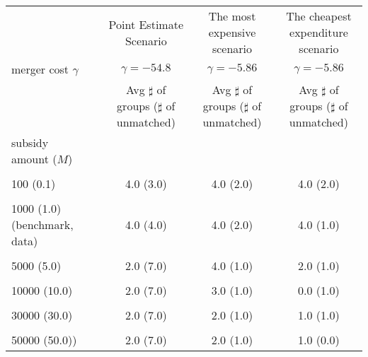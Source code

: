 \begin{tabular}{@{\extracolsep{5pt}}lcccc}
\toprule 
 &  & Point Estimate Scenario & The most expensive scenario & The cheapest expenditure scenario \\
merger cost $\gamma$ &  & $\gamma=-54.8$ & $\gamma=-5.86$ & $\gamma=-5.86$ \\
 &  & Avg $\sharp$ of groups ($\sharp$ of unmatched) & Avg $\sharp$ of groups ($\sharp$ of unmatched) & Avg $\sharp$ of groups ($\sharp$ of unmatched) \\
\midrule 
subsidy amount ($M$) &  &  &  &  \\
 &  &  &  &  \\
100 (0.1) &  & 4.0 (3.0) & 4.0 (2.0) & 4.0 (2.0) \\
 &  &  &  &  \\
1000 (1.0) (benchmark, data) &  & 4.0 (4.0) & 4.0 (2.0) & 4.0 (1.0) \\
 &  &  &  &  \\
5000 (5.0) &  & 2.0 (7.0) & 4.0 (1.0) & 2.0 (1.0) \\
 &  &  &  &  \\
10000 (10.0) &  & 2.0 (7.0) & 3.0 (1.0) & 0.0 (1.0) \\
 &  &  &  &  \\
30000 (30.0) &  & 2.0 (7.0) & 2.0 (1.0) & 1.0 (1.0) \\
 &  &  &  &  \\
50000 (50.0)) &  & 2.0 (7.0) & 2.0 (1.0) & 1.0 (0.0) \\
\hline 
\bottomrule 
\end{tabular}
